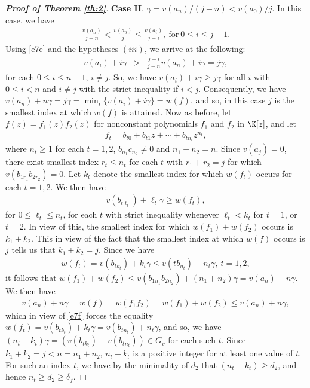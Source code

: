 \documentclass[12pt]{amsart}%
\begin{document}
\begin{proof}[\bf Proof of Theorem \ref{th:2}]
\textbf{Case II}. $\gamma={v(a_n)}/{(j-n)}<v(a_0)/j$. In this case, we have
\begin{eqnarray}\label{e7e}
\frac{v(a_n)}{j-n} <\frac{v(a_0)}{j} \leq \frac{v(a_i)}{j-i}, ~\textrm{for}~ 0\leq i\leq j-1.
\end{eqnarray}
Using \eqref{e7e} and the hypotheses $(iii)$, we arrive at the following:
\begin{eqnarray*}
v(a_i)+i\gamma&> & \frac{j-i}{j-n}v(a_n)+i\gamma=j\gamma,
\end{eqnarray*}
for each $0\leq i\leq n-1$, $i\neq j$. So, we have $v(a_i)+i\gamma\geq j\gamma$ for all $i$ with $0\leq i<n$ and $i\neq j$ with the strict inequality if $i<j$. Consequently, we have $v(a_n)+n\gamma =j\gamma=\min_i\{v(a_i)+i\gamma\}=w(f)$, and so, in this case $j$ is the smallest index at which $w(f)$ is attained. Now as before, let $f(z)=f_1(z)f_2(z)$ for nonconstant polynomials $f_1$ and $f_2$ in $\K[z]$, and let
\begin{eqnarray*}
f_{t}=b_{t0}+b_{t1}z+\cdots+b_{tn_t}z^{n_t},
\end{eqnarray*}
where $n_t\geq 1$ for each $t=1,2$, $b_{n_1}c_{n_2}\neq 0$ and $n_1+n_2=n$. Since $v(a_j)=0$, there exist smallest index $r_t\leq n_t$ for each $t$ with $r_1+r_2=j$ for which $v(b_{1r_1}b_{2r_2})=0$. Let $k_t$ denote the smallest index for which $w(f_t)$ occurs for each $t=1,2$. We then have
\begin{eqnarray*}
v(b_{t\ell_t})+\ell_t\gamma\geq w(f_t),
\end{eqnarray*}
for $0\leq \ell_t \leq n_t$, for each $t$ with strict inequality whenever $\ell_t<k_t$ for $t=1$, or $t=2$. In view of this, the smallest index for which $w(f_1)+w(f_2)$ occurs is $k_1+k_2$. This in view of the fact that the smallest index at which $w(f)$ occurs is $j$ tells us that  $k_1+k_2=j$. Since we have
\begin{eqnarray}\label{e7f}
w(f_t)=v(b_{tk_t})+k_t\gamma\leq v(tb_{n_t})+n_t\gamma,~t=1,2,
\end{eqnarray}
it follows that $w(f_1)+w(f_2)\leq v(b_{1n_1}b_{2n_2})+(n_1+n_2)\gamma=v(a_n)+n\gamma$. We then have
\begin{eqnarray*}
v(a_n)+n\gamma=w(f)=w(f_1f_2)=w(f_1)+w(f_2)\leq v(a_n)+n\gamma,
\end{eqnarray*}
which in view of \eqref{e7f} forces the equality $w(f_t)=v(b_{tk_t})+k_t\gamma =v(b_{tn_t})+n_t\gamma$, and so, we have $(n_t-k_t)\gamma=(v(b_{tk_t})-v(b_{tn_t})) \in G_v$ for each such $t$. Since $k_1+k_2=j<n=n_1+n_2$, $n_t-k_t$ is a positive integer for at least one value of $t$. For such an index $t$, we have by the minimality of $d_2$ that $(n_t-k_t)\geq d_2$, and hence $n_t\geq d_2 \geq \delta_f$.
\end{proof}
\end{document}
